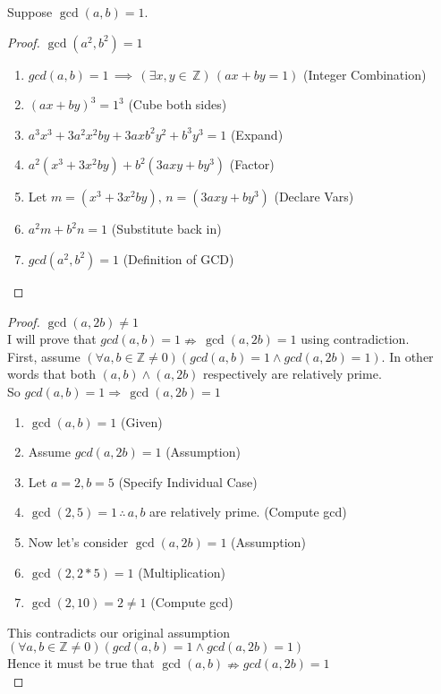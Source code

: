 \documentclass[12pt]{article}
\newcommand{\Z}{\mathbb{Z}}
\newenvironment{question}[2][Question]{\begin{trivlist}
\item[\hskip \labelsep {\bfseries #1}\hskip \labelsep {\bfseries #2.}]}{\end{trivlist}}
\begin{document}
\begin{question}{6.18} Suppose $\gcd(a,b)=1$.
\begin{proof}
$\gcd(a^2,b^2)=1$
	\begin{enumerate}
		\item $gcd(a,b)=1 \, \implies \, (\exists x,y \in \,\Z) \, (ax+by=1)$ \hfill(Integer Combination)
		\item $(ax+by)^3=1^3$ \hfill(Cube both sides)
		\item $a^3x^3+3a^2x^2by+3axb^2y^2+b^3y^3=1$ \hfill(Expand)
		\item $a^2(x^3+3x^2by)+b^2(3axy+by^3)$ \hfill(Factor)
		\item Let $m=(x^3+3x^2by),\, n=(3axy+by^3)$ \hfill(Declare Vars)
		\item $a^2m+b^2n=1$ \hfill(Substitute back in) 
		\item $gcd(a^2,b^2) = 1$ \hfill(Definition of GCD)
	\end{enumerate}
\end{proof}
\begin{proof}
$\gcd(a,2b)\neq 1$\\
I will prove that $gcd(a,b)=1 \nRightarrow \, \gcd(a,2b)=1$ using contradiction. \\First, assume $(\forall a,b \in \Z \neq 0)(gcd(a,b)=1 \wedge gcd(a,2b)=1)$. In other words that both $(a,b) \wedge (a,2b)$ respectively are relatively prime. \\So $gcd(a,b)=1 \Rightarrow \, \gcd(a,2b)=1$ 
\begin{enumerate}
	\item $\gcd(a,b)=1$ \hfill(Given)
	\item Assume $gcd(a,2b)=1$ \hfill(Assumption)
	\item Let $a=2, b=5$ \hfill(Specify Individual Case)
	\item $\gcd(2,5) = 1 \, \therefore \, a,b$ are relatively prime. \hfill(Compute gcd)
	\item Now let's consider $\gcd(a,2b)=1$ \hfill(Assumption)
	\item $\gcd(2,2*5)=1$ \hfill(Multiplication)
	\item $\gcd(2,10)=2\neq 1$ \hfill(Compute gcd)
\end{enumerate}
This contradicts our original assumption $(\forall a,b \in \Z \neq 0)(gcd(a,b)=1 \wedge gcd(a,2b)=1)$\\
Hence it must be true that $\gcd(a,b) \nRightarrow gcd(a,2b)=1$\\
\end{proof}
\end{question}
\end{document}
